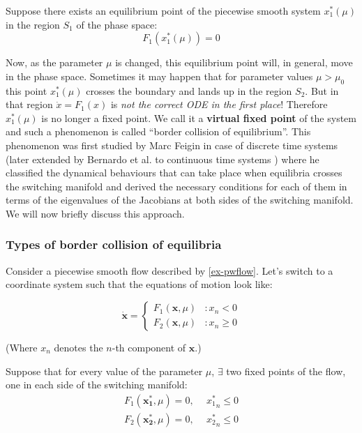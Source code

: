 \documentclass{book}
\renewcommand{\(}{\begin{columns}}
\renewcommand{\)}{\end{columns}}
\newcommand{\<}[1]{\begin{column}{#1}}
\renewcommand{\>}{\end{column}}
\newcommand{\bb}[1]{\textbf{#1}}
\newcommand{\mb}[1]{\mathbf{#1}}
\begin{document}
Suppose there exists an equilibrium point of the 
piecewise smooth system $x_1^*(\mu)$ in the region $S_1$ of the phase space:
\[
F_1(x_1^*(\mu))=0
\]


Now, as the parameter $\mu$ is changed, this equilibrium point will, in general, move in the phase 
space.  Sometimes it may happen that for parameter values $\mu>\mu_0$ this point $x_1^*(\mu)$ crosses the 
boundary and lands up in the region $S_2$.  But in that region $\dot{x}=F_1(x)$ 
is \emph{not the correct ODE in the first place}! Therefore $x_1^*(\mu)$ is no longer 
a fixed point.  We call it a \bb{virtual fixed point}  of the system and such a phenomenon is called 
``border collision of equilibrium''. This phenomenon was first studied by Marc 
Feigin in case of discrete time systems \cite{feigin-1999}(later extended by 
Bernardo et al. to continuous time systems \cite{bernardo-c-cases}) where he classified the dynamical 
behaviours that can take place when equilibria crosses the switching manifold and 
 derived the necessary conditions for each of them in
terms of the eigenvalues of the Jacobians at both sides of the switching 
manifold. We will now briefly discuss this approach.  

\subsubsection{Types of border collision of equilibria}
Consider a piecewise smooth flow described by \eqref{ex-pwflow}. Let's switch 
to a coordinate system such that the equations of motion look like:

\begin{equation}
\label{ex-pwflow_normal}
   \dot{\mathbf{x}} = \left\{
     \begin{array}{lr}
       F_1(\mathbf{x},\mu) & : x_n<0\\
       F_2(\mathbf{x},\mu) & : x_n\geq0
     \end{array}
   \right.
\end{equation}

(Where $x_n$ denotes the $n$-th component of $\mathbf{x}$.)

Suppose that for every value of the parameter $\mu$, $\exists$ two fixed 
points of the flow, one in each side of the switching manifold:
\begin{align}
\label{def-2fps}
F_1(\mb{x_1^*},\mu)=0,&~~{x_1^*}_n\leq 0\\
F_2(\mb{x_2^*},\mu)=0,&~~{x_2^*}_n\leq 0
\end{align}
\end{document}
